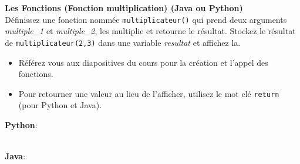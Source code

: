     \begin{Exercice}[5 minutes] \textbf{Les Fonctions (Fonction multiplication) (Java ou Python)}\\
    Définissez une fonction nommée \lstinline{multiplicateur()} qui prend deux arguments \textit{multiple\_1} et \textit{multiple\_2}, les multiplie et retourne le résultat. Stockez le résultat de \lstinline{multiplicateur(2,3)} dans une variable \textit{resultat} et affichez la.   \\

    \begin{conseil}
        \begin{itemize}
            \item Référez vous aux diapositives du cours pour la création et l'appel des fonctions.
            \item Pour retourner une valeur au lieu de l'afficher, utilisez le mot clé \lstinline{return} (pour Python et Java).
        \end{itemize}        
    \end{conseil}
    \begin{solution}
        \textbf{Python}:
        
        \textbf{\\Java}:
    \end{solution}   
\end{Exercice} 
  
